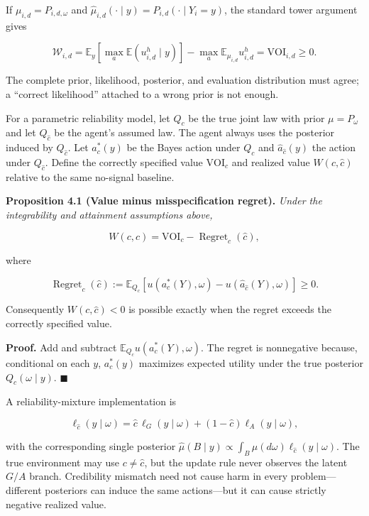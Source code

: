 \documentclass[
  11pt]{article}
\begin{document}
If \(\mu_{i,d}=P_{i,d,\omega}\) and
\(\widehat\mu_{i,d}(\cdot\mid y)=P_{i,d}(\cdot\mid Y_i=y)\), the
standard tower argument gives

\[\mathcal W_{i,d}=\mathbb E_y\!\left[\max_a\mathbb E(u^h_{i,d}\mid y)\right]-\max_a\mathbb E_{\mu_{i,d}}u^h_{i,d}=\mathrm{VOI}_{i,d}\ge0.\]

The complete prior, likelihood, posterior, and evaluation distribution
must agree; a ``correct likelihood'' attached to a wrong prior is not
enough.

For a parametric reliability model, let \(Q_c\) be the true joint law
with prior \(\mu=P_\omega\) and let \(Q_{\hat c}\) be the agent's
assumed law. The agent always uses the posterior induced by
\(Q_{\hat c}\). Let \(a_c^*(y)\) be the Bayes action under \(Q_c\) and
\(\widehat a_{\hat c}(y)\) the action under \(Q_{\hat c}\). Define the
correctly specified value \(\mathrm{VOI}_c\) and realized value
\(W(c,\hat c)\) relative to the same no-signal baseline.

\textbf{Proposition 4.1 (Value minus misspecification regret).}
\emph{Under the integrability and attainment assumptions above,}

\[W(c,\hat c)=\mathrm{VOI}_c-\operatorname{Regret}_c(\hat c),\tag{4}\]

where

\[\operatorname{Regret}_c(\hat c):=\mathbb E_{Q_c}\!\left[u(a_c^*(Y),\omega)-u(\widehat a_{\hat c}(Y),\omega)\right]\ge0.\]

Consequently \(W(c,\hat c)<0\) is possible exactly when the regret
exceeds the correctly specified value.

\textbf{Proof.} Add and subtract \(\mathbb E_{Q_c}u(a_c^*(Y),\omega)\).
The regret is nonnegative because, conditional on each \(y\),
\(a_c^*(y)\) maximizes expected utility under the true posterior
\(Q_c(\omega\mid y)\). \(\blacksquare\)

A reliability-mixture implementation is

\[\ell_{\hat c}(y\mid\omega)=\hat c\,\ell_G(y\mid\omega)+(1-\hat c)\ell_A(y\mid\omega),\]

with the corresponding single posterior
\(\widehat\mu(B\mid y)\propto\int_B\mu(d\omega)\ell_{\hat c}(y\mid\omega)\).
The true environment may use \(c\ne\hat c\), but the update rule never
observes the latent \(G/A\) branch. Credibility mismatch need not cause
harm in every problem---different posteriors can induce the same
actions---but it can cause strictly negative realized value.
\end{document}
